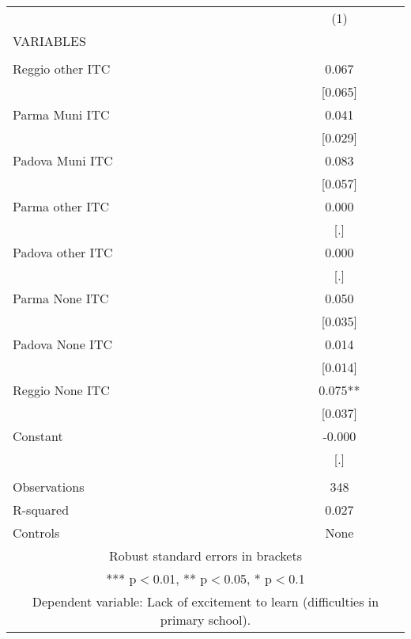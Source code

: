 \begin{tabular}{lc} \hline
 & (1) \\
VARIABLES &  \\ \hline
 &  \\
Reggio other ITC & 0.067 \\
 & [0.065] \\
Parma Muni ITC & 0.041 \\
 & [0.029] \\
Padova Muni ITC & 0.083 \\
 & [0.057] \\
Parma other ITC & 0.000 \\
 & [.] \\
Padova other ITC & 0.000 \\
 & [.] \\
Parma None ITC & 0.050 \\
 & [0.035] \\
Padova None ITC & 0.014 \\
 & [0.014] \\
Reggio None ITC & 0.075** \\
 & [0.037] \\
Constant & -0.000 \\
 & [.] \\
 &  \\
Observations & 348 \\
R-squared & 0.027 \\
 Controls & None \\ \hline
\multicolumn{2}{c}{ Robust standard errors in brackets} \\
\multicolumn{2}{c}{ *** p$<$0.01, ** p$<$0.05, * p$<$0.1} \\
\multicolumn{2}{c}{ Dependent variable: Lack of excitement to learn (difficulties in primary school).} \\
\end{tabular}
